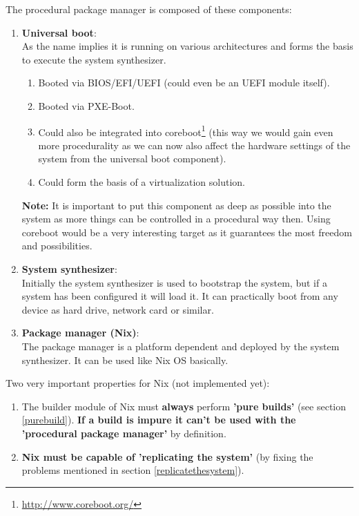 \documentclass[a4paper,10pt]{article}
\begin{document}
The procedural package manager is composed of these components:
\begin{enumerate}
\item \textbf{Universal boot}:\\
      As the name implies it is running on various architectures and forms the basis to execute the system synthesizer.

      \begin{enumerate}
       \item Booted via BIOS/EFI/UEFI (could even be an UEFI module itself).
       \item Booted via PXE-Boot.
       \item Could also be integrated into coreboot\footnote{\url{http://www.coreboot.org/}} (this way we would gain even more procedurality as we can now also affect the hardware settings of the system from the universal boot component).
       \item Could form the basis of a virtualization solution.
      \end{enumerate}
\textbf{Note:} It is important to put this component as deep as possible into the system as more things can be controlled in a procedural way then. Using coreboot would be a very interesting target as it guarantees the most freedom and possibilities.

\item \textbf{System synthesizer}:\\
      Initially the system synthesizer is used to bootstrap the system, but if a system has been configured it will load it. It can practically boot from any device as hard drive, network card or similar.
\item \textbf{Package manager (Nix)}:\\
      The package manager is a platform dependent and deployed by the system synthesizer. It can be used like Nix OS basically.\\
\end{enumerate}

Two very important properties for Nix (not implemented yet):
\begin{enumerate}
 \item The builder module of Nix must \textbf{always} perform \textbf{'pure builds'} (see section \ref{purebuild}). \textbf{If a build is impure it can't be used with the 'procedural package manager'} by definition.
\item \textbf{Nix must be capable of 'replicating the system'} (by fixing the problems mentioned in section \ref{replicatethesystem}).
\end{enumerate}
\end{document}
